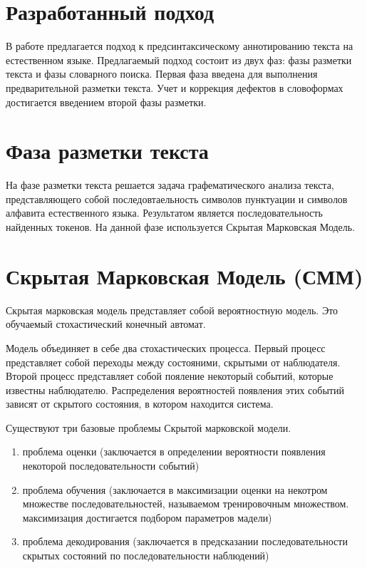 \documentclass[14pt]{extarticle}
\begin{document}
\section{Разработанный подход}
В работе предлагается подход к предсинтаксическому аннотированию текста на естественном языке. Предлагаемый подход состоит из двух фаз: фазы разметки текста и фазы словарного поиска. Первая фаза введена для выполнения предварительной разметки текста. Учет и коррекция дефектов в словоформах достигается введением второй фазы разметки.

\section{Фаза разметки текста}
На фазе разметки текста решается задача графематического анализа текста, представляющего собой последовтаельность символов пунктуации и символов алфавита естественного языка. Результатом является последовательность найденных токенов. На данной фазе используется Скрытая Марковская Модель.

\section{Скрытая Марковская Модель (СММ)}

Скрытая марковская модель представляет собой вероятностную модель. Это обучаемый стохастический конечный автомат. 

Модель объединяет в себе два стохастических процесса. Первый процесс представляет собой переходы между состояними, скрытыми от наблюдателя. Второй процесс представляет собой пояление некоторый событий, которые известны наблюдателю. Распределения вероятностей появления этих событий зависят от скрытого состояния, в котором находится система.

Существуют три базовые проблемы Скрытой марковской модели.
\begin{enumerate}
	\item 
	проблема оценки (заключается в определении вероятности появления некоторой последовательности событий)
	\item
	проблема обучения (заключается в максимизации оценки на некотром множестве последовательностей, называемом тренировочным множеством. максимизация достигается подбором параметров мадели)
	\item
	проблема декодирования (заключается в предсказании последовательности скрытых состояний по последовательности наблюдений)
\end{enumerate}
\end{document}
